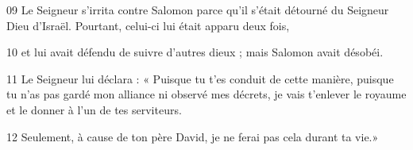 
09 Le Seigneur s’irrita contre Salomon parce qu’il s’était détourné du Seigneur Dieu d’Israël. Pourtant, celui-ci lui était apparu deux fois,

10 et lui avait défendu de suivre d’autres dieux ; mais Salomon avait désobéi.

11 Le Seigneur lui déclara : « Puisque tu t’es conduit de cette manière, puisque tu n’as pas gardé mon alliance ni observé mes décrets, je vais t’enlever le royaume et le donner à l’un de tes serviteurs.

12 Seulement, à cause de ton père David, je ne ferai pas cela durant ta vie.»